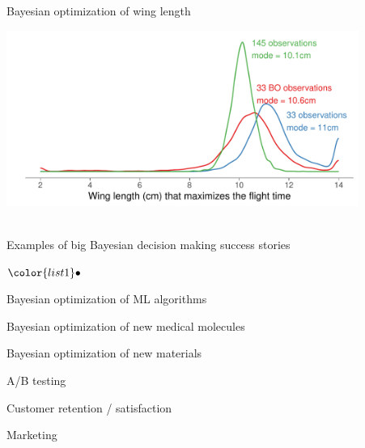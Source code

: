 \documentclass[t]{beamer}
\newenvironment{list1}{
   \begin{list}{$\color{list1}\bullet$}{\itemsep=6pt}}{
  \end{list}}
\begin{document}
\begin{frame}{Bayesian optimization of wing length}

  {\hspace{-8mm}\includegraphics[width=11.5cm]{helicopter_bo_maximizing_density_2.pdf}\\
    \\}
  
\end{frame}  

\begin{frame}{Examples of big Bayesian decision making success stories}

  \begin{list1}
    \item Bayesian optimization of ML algorithms
    \item Bayesian optimization of new medical molecules
    \item Bayesian optimization of new materials
    \item A/B testing
    \item Customer retention / satisfaction
    \item Marketing
  \end{list1}
  
\end{frame}
\end{document}
